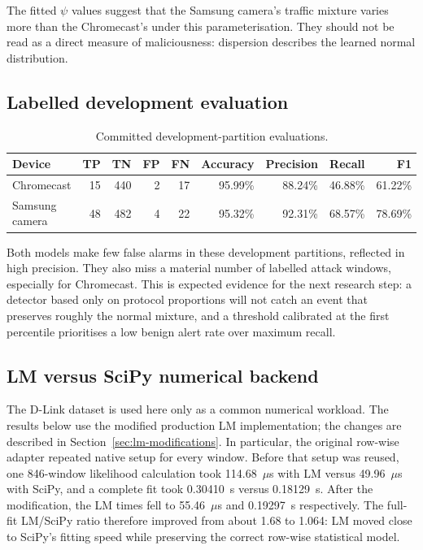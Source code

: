 \documentclass[11pt,a4paper]{article}
\begin{document}
The fitted $\psi$ values suggest that the Samsung camera's traffic mixture varies more than the Chromecast's under this parameterisation. They should not be read as a direct measure of maliciousness: dispersion describes the learned normal distribution.

\subsection{Labelled development evaluation}

\begin{table}[ht]
\centering
\small
\begin{tabular}{lrrrrrrrr}
\toprule
\textbf{Device} & \textbf{TP} & \textbf{TN} & \textbf{FP} & \textbf{FN} & \textbf{Accuracy} & \textbf{Precision} & \textbf{Recall} & \textbf{F1} \\
\midrule
Chromecast & 15 & 440 & 2 & 17 & 95.99\% & 88.24\% & 46.88\% & 61.22\% \\
Samsung camera & 48 & 482 & 4 & 22 & 95.32\% & 92.31\% & 68.57\% & 78.69\% \\
\bottomrule
\end{tabular}
\caption{Committed development-partition evaluations.}
\label{tab:evaluation}
\end{table}

Both models make few false alarms in these development partitions, reflected in high precision. They also miss a material number of labelled attack windows, especially for Chromecast. This is expected evidence for the next research step: a detector based only on protocol proportions will not catch an event that preserves roughly the normal mixture, and a threshold calibrated at the first percentile prioritises a low benign alert rate over maximum recall.

\subsection{LM versus SciPy numerical backend}

The D-Link dataset is used here only as a common numerical workload. The results below use the modified production LM implementation; the changes are described in Section~\ref{sec:lm-modifications}. In particular, the original row-wise adapter repeated native setup for every window. Before that setup was reused, one 846-window likelihood calculation took 114.68~$\mu$s with LM versus 49.96~$\mu$s with SciPy, and a complete fit took 0.30410~s versus 0.18129~s. After the modification, the LM times fell to 55.46~$\mu$s and 0.19297~s respectively. The full-fit LM/SciPy ratio therefore improved from about 1.68 to 1.064: LM moved close to SciPy's fitting speed while preserving the correct row-wise statistical model.
\end{document}

